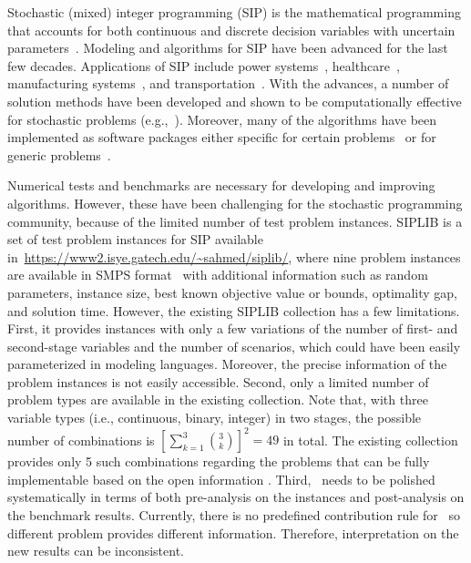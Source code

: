 Stochastic (mixed) integer programming (SIP) is the mathematical programming that accounts for 
both continuous and discrete decision variables with uncertain parameters~\cite{book:BL2011}. 
Modeling and algorithms for SIP have been advanced for the last few decades. Applications of SIP include power systems~\cite{?}, healthcare~\cite{?}, manufacturing systems~\cite{?}, and transportation~\cite{?}. With the advances, a number of solution methods have been developed and shown to be computationally effective for stochastic problems (e.g.,~\cite{?}). Moreover, many of the algorithms have been implemented as software packages either specific for certain problems~\cite{?} or for generic problems~\cite{?}.

Numerical tests and benchmarks are necessary for developing and improving algorithms. However,
these have been challenging for the stochastic programming community, because of the limited number of test problem instances. 
SIPLIB is a set of test problem instances for SIP available in~\url{https://www2.isye.gatech.edu/~sahmed/siplib/}, where nine problem instances are available in SMPS format~\cite{?} with additional information such as random parameters, 
instance size, best known objective value or bounds, optimality gap, and solution time.  
However, the existing SIPLIB collection has a few limitations. 
First, it provides instances with only a few variations of the number of first- and second-stage variables and the number of scenarios, which could have been easily parameterized in 
modeling languages. Moreover, the precise information of the problem instances is 
not easily accessible. Second, only a limited number of problem types are available in 
the existing collection. Note that, with three variable types (i.e., continuous, 
binary, integer) in two stages, the possible number of combinations is $\left[\sum_{k=1}
^3\binom{3}{k}\right]^2=49$ in total. 
The existing collection provides only 5 such combinations 
regarding the problems that can be fully implementable based on the open information .
Third, \siplib\ needs to be polished systematically in terms of both pre-analysis on the 
instances and post-analysis on the benchmark results. Currently, there is no predefined 
contribution rule for \siplib\ so different problem provides different information. 
Therefore, interpretation on the new results can be inconsistent.

